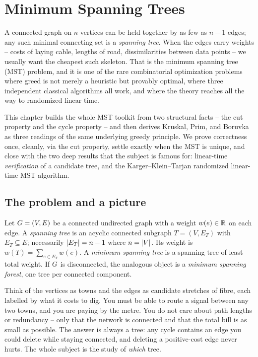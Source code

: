 \chapter{Minimum Spanning Trees}

A connected graph on $n$ vertices can be held together by as few as $n-1$ edges; any such minimal connecting set is a \emph{spanning tree}. When the edges carry weights -- costs of laying cable, lengths of road, dissimilarities between data points -- we usually want the cheapest such skeleton. That is the minimum spanning tree (MST) problem, and it is one of the rare combinatorial optimization problems where greed is not merely a heuristic but provably optimal, where three independent classical algorithms all work, and where the theory reaches all the way to randomized linear time.

This chapter builds the whole MST toolkit from two structural facts -- the cut property and the cycle property -- and then derives Kruskal, Prim, and Boruvka as three readings of the same underlying greedy principle. We prove correctness once, cleanly, via the cut property, settle exactly when the MST is unique, and close with the two deep results that the subject is famous for: linear-time \emph{verification} of a candidate tree, and the Karger--Klein--Tarjan randomized linear-time MST algorithm.

\chapterline

\section{The problem and a picture}

\begin{definition}
Let $G=(V,E)$ be a connected undirected graph with a weight $w(e)\in\mathbb{R}$ on each edge. A \emph{spanning tree} is an acyclic connected subgraph $T=(V,E_T)$ with $E_T\subseteq E$; necessarily $\lvert E_T\rvert=n-1$ where $n=\lvert V\rvert$. Its weight is $w(T)=\sum_{e\in E_T} w(e)$. A \emph{minimum spanning tree} is a spanning tree of least total weight. If $G$ is disconnected, the analogous object is a \emph{minimum spanning forest}, one tree per connected component.
\end{definition}

\begin{intuitionbox}
Think of the vertices as towns and the edges as candidate stretches of fibre, each labelled by what it costs to dig. You must be able to route a signal between any two towns, and you are paying by the metre. You do not care about path lengths or redundancy -- only that the network is connected and that the total bill is as small as possible. The answer is always a tree: any cycle contains an edge you could delete while staying connected, and deleting a positive-cost edge never hurts. The whole subject is the study of \emph{which} tree.
\end{intuitionbox}

